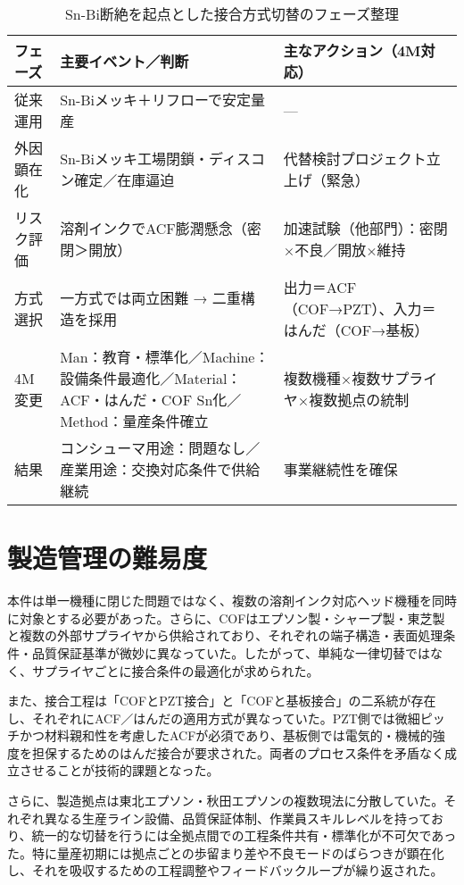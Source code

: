 \documentclass[conference]{IEEEtran}
\begin{document}
\begin{table}[t]
\centering
\footnotesize
\caption{Sn-Bi断絶を起点とした接合方式切替のフェーズ整理}
\label{tab:flow}
\renewcommand{\arraystretch}{1.1}
\begin{tabularx}{\columnwidth}{@{}p{1.8cm} Y Y@{}}
\toprule
フェーズ & 主要イベント／判断 & 主なアクション（4M対応） \\
\midrule
従来運用 &
Sn-Biメッキ＋リフローで安定量産 &
— \\
\addlinespace[2pt]
外因顕在化 &
Sn-Biメッキ工場閉鎖・ディスコン確定／在庫逼迫 &
代替検討プロジェクト立上げ（緊急） \\
\addlinespace[2pt]
リスク評価 &
溶剤インクでACF膨潤懸念（密閉＞開放） &
加速試験（他部門）：密閉×不良／開放×維持 \\
\addlinespace[2pt]
方式選択 &
一方式では両立困難 → 二重構造を採用 &
出力＝ACF（COF→PZT）、入力＝はんだ（COF→基板） \\
\addlinespace[2pt]
4M変更 &
Man：教育・標準化／Machine：設備条件最適化／Material：ACF・はんだ・COF Sn化／Method：量産条件確立 &
複数機種×複数サプライヤ×複数拠点の統制 \\
\addlinespace[2pt]
結果 &
コンシューマ用途：問題なし／産業用途：交換対応条件で供給継続 &
事業継続性を確保 \\
\bottomrule
\end{tabularx}
\end{table}

\section{製造管理の難易度}
本件は単一機種に閉じた問題ではなく、複数の溶剤インク対応ヘッド機種を同時に対象とする必要があった。さらに、COFはエプソン製・シャープ製・東芝製と複数の外部サプライヤから供給されており、それぞれの端子構造・表面処理条件・品質保証基準が微妙に異なっていた。したがって、単純な一律切替ではなく、サプライヤごとに接合条件の最適化が求められた。  

また、接合工程は「COFとPZT接合」と「COFと基板接合」の二系統が存在し、それぞれにACF／はんだの適用方式が異なっていた。PZT側では微細ピッチかつ材料親和性を考慮したACFが必須であり、基板側では電気的・機械的強度を担保するためのはんだ接合が要求された。両者のプロセス条件を矛盾なく成立させることが技術的課題となった。  

さらに、製造拠点は東北エプソン・秋田エプソンの複数現法に分散していた。それぞれ異なる生産ライン設備、品質保証体制、作業員スキルレベルを持っており、統一的な切替を行うには全拠点間での工程条件共有・標準化が不可欠であった。特に量産初期には拠点ごとの歩留まり差や不良モードのばらつきが顕在化し、それを吸収するための工程調整やフィードバックループが繰り返された。  
\end{document}
